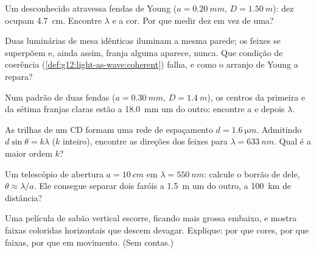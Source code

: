 \begin{exercise}[$\star\star$]\label{exo:g12:light-as-wave:7}
Um  desconhecido atravessa fendas de Young ($a = \qty{0.20}{mm}$,
$D = \qty{1.50}{m}$): dez  ocupam \qty{4.7}{cm}. Encontre
$\lambda$ e a cor. Por que medir dez em vez de uma?
\end{exercise}

\begin{exercise}[$\star\star$]\label{exo:g12:light-as-wave:8}
Duas luminárias de mesa idênticas iluminam a mesma parede; os feixes se
superpõem e, ainda assim, franja alguma aparece, nunca. Que condição de
coerência (\cref{def:g12:light-as-wave:coherent}) falha, e como o arranjo
de Young a repara?
\end{exercise}

\begin{exercise}[$\star\star$]\label{exo:g12:light-as-wave:9}
Num padrão de duas fendas ($a = \qty{0.30}{mm}$, $D = \qty{1.4}{m}$), os
centros da primeira e da sétima franjas claras estão a \qty{18.0}{mm} um
do outro: encontre a  e depois $\lambda$.
\end{exercise}

\begin{exercise}[$\star\star$]\label{exo:g12:light-as-wave:10}
As trilhas de um CD formam uma rede de espaçamento
$d = \qty{1.6}{\micro m}$. Admitindo $d \sin\theta = k\lambda$ ($k$
inteiro), encontre as direções dos feixes para
$\lambda = \qty{633}{nm}$. Qual é a maior ordem $k$?
\end{exercise}

\begin{exercise}[$\star\star$]\label{exo:g12:light-as-wave:11}
Um telescópio de abertura $a = \qty{10}{cm}$ em
$\lambda = \qty{550}{nm}$: calcule o borrão de  dele,
$\theta \approx \lambda/a$. Ele consegue separar dois faróis a
\qty{1.5}{m} um do outro, a \qty{100}{km} de distância?
\end{exercise}

\begin{exercise}[$\star\star\star$]\label{exo:g12:light-as-wave:12}
Uma película de sabão vertical escorre, ficando mais grossa embaixo, e
mostra faixas coloridas horizontais que descem devagar. Explique: por que
cores, por que faixas, por que em movimento. (Sem contas.)
\end{exercise}

